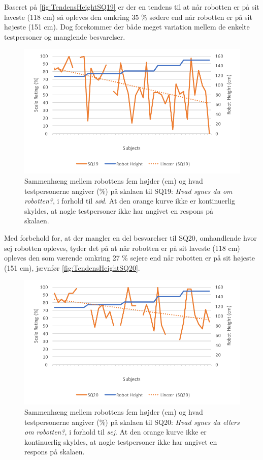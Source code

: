 \noindent
%
Baseret på \autoref{fig:TendensHeightSQ19} er der en tendens til at når robotten er på sit laveste (118 cm) så opleves den omkring 35 \% sødere end når robotten er på sit højeste (151 cm). Dog forekommer der både meget variation mellem de enkelte testpersoner og manglende besvarelser. 
%
\begin{figure}[H]
\centering
\includegraphics[width=\textwidth]{Figure/DatabehandlingSkalaer/TendensHeight/HeightSQ19}
\caption{Sammenhæng mellem robottens fem højder (cm) og hvad testpersonerne angiver (\%) på skalaen til SQ19: \textit{Hvad synes du om robotten?}, i forhold til \textit{sød}. At den orange kurve ikke er kontinuerlig skyldes, at nogle testpersoner ikke har angivet en respons på skalaen.}
\label{fig:TendensHeightSQ19}
\end{figure}
\noindent
%
Med forbehold for, at der mangler en del besvarelser til SQ20, omhandlende hvor sej robotten opleves, tyder det på at når robotten er på sit laveste (118 cm) opleves den som værende omkring 27 \% sejere end når robotten er på sit højeste (151 cm), jævnfør \autoref{fig:TendensHeightSQ20}.
%
\begin{figure}[H]
\centering
\includegraphics[width=\textwidth]{Figure/DatabehandlingSkalaer/TendensHeight/HeightSQ20}
\caption{Sammenhæng mellem robottens fem højder (cm) og hvad testpersonerne angiver (\%) på skalaen til SQ20: \textit{Hvad synes du ellers om robotten?}, i forhold til \textit{sej}. At den orange kurve ikke er kontinuerlig skyldes, at nogle testpersoner ikke har angivet en respons på skalaen.}
\label{fig:TendensHeightSQ20}
\end{figure}
